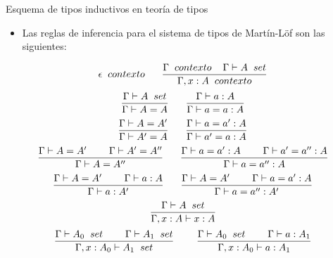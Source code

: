 \documentclass[dvipsnames, 8pt]{beamer} %
\theoremstyle{plain}
\theoremstyle{definition}
\begin{document}
\begin{frame}{Esquema de tipos inductivos en teoría de tipos}
    \begin{itemize}
        \item Las reglas de inferencia para el sistema de tipos de Martín-Löf son las siguientes:\pause
    \end{itemize}
    $$\epsilon \hspace{2mm} contexto \hspace{6mm} \frac{\Gamma\hspace{2mm} contexto \hspace{4mm} \Gamma \vdash A \hspace{2mm} set}{\Gamma,x:A \hspace{2mm} contexto}$$
    \vspace{0.3mm}
    $$\frac{\Gamma \vdash A \hspace{2mm} set}{\Gamma \vdash A = A} \hspace{6mm} \frac{\Gamma \vdash a : A}{\Gamma \vdash a = a : A}$$
    \vspace{0.3mm}
    $$\frac{\Gamma \vdash A = A'}{\Gamma \vdash A' = A} \hspace{6mm} \frac{\Gamma \vdash a = a' : A}{\Gamma \vdash a' = a : A}$$
    \vspace{0.3mm}
    $$\frac{\Gamma \vdash A = A' \hspace{8mm} \Gamma \vdash A' = A''}{\Gamma \vdash A = A''} \hspace{6mm} \frac{\Gamma \vdash a = a' : A \hspace{8mm} \Gamma \vdash a' = a'' : A}{\Gamma \vdash a = a'' : A}$$
    \vspace{0.3mm}
    $$\frac{\Gamma \vdash A = A' \hspace{8mm} \Gamma \vdash a : A}{\Gamma \vdash a : A'} \hspace{6mm} \frac{\Gamma \vdash A = A' \hspace{8mm} \Gamma \vdash a = a' : A}{\Gamma \vdash a = a'' : A'}$$
    \vspace{0.3mm}
    $$\frac{\Gamma\vdash A \hspace{2mm} set}{\Gamma, x:A \vdash x:A}$$
    \vspace{0.3mm}
    $$\frac{\Gamma\vdash A_{0} \hspace{2mm} set \hspace{8mm} \Gamma\vdash A_{1} \hspace{2mm} set}{\Gamma, x:A_{0} \vdash A_{1} \hspace{2mm}set} \hspace{8mm} \frac{\Gamma\vdash A_{0} \hspace{2mm} set \hspace{8mm} \Gamma\vdash a:A_{1}}{\Gamma, x:A_{0} \vdash a:A_{1}}$$
\end{frame}
\end{document}
